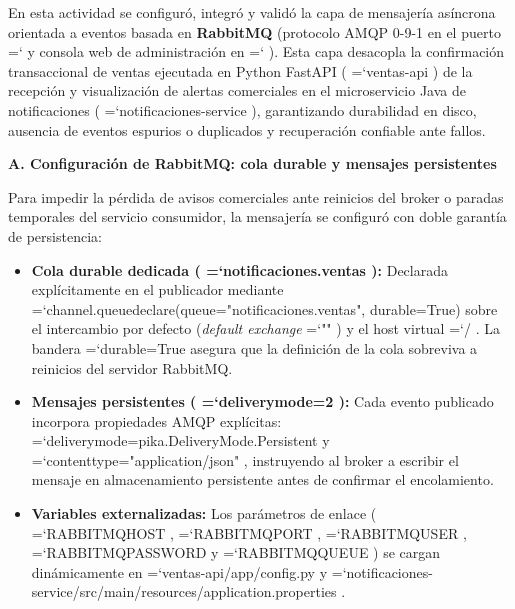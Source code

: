 \documentclass[11pt,a4paper]{article}
\renewcommand{\_}{\oldunderscore\allowbreak}
\DeclareRobustCommand{\texttt}[1]{%
  {\upshape\ttfamily\fontsize{9}{10.8}\selectfont\hyphenchar\font=`\-\relax #1}%
}
\begin{document}
\vspace{0.2cm}
\noindent En esta actividad se configuró, integró y validó la capa de mensajería asíncrona orientada a eventos basada en \textbf{RabbitMQ} (protocolo AMQP 0-9-1 en el puerto \texttt{5672} y consola web de administración en \texttt{15672}). Esta capa desacopla la confirmación transaccional de ventas ejecutada en Python FastAPI (\texttt{ventas-api}) de la recepción y visualización de alertas comerciales en el microservicio Java de notificaciones (\texttt{notificaciones-service}), garantizando durabilidad en disco, ausencia de eventos espurios o duplicados y recuperación confiable ante fallos.

\vspace{0.2cm}
\noindent\textbf{A. Configuración de RabbitMQ: cola durable y mensajes persistentes}

\noindent Para impedir la pérdida de avisos comerciales ante reinicios del broker o paradas temporales del servicio consumidor, la mensajería se configuró con doble garantía de persistencia:
\begin{itemize}[leftmargin=*,itemsep=2pt,topsep=1pt]
  \item \textbf{Cola durable dedicada (\texttt{notificaciones.\allowbreak{}ventas}):} Declarada explícitamente en el publicador mediante \texttt{channel.\allowbreak{}queue\_declare(queue=\allowbreak{}"notificaciones.\allowbreak{}ventas", durable=\allowbreak{}True)} sobre el intercambio por defecto (\textit{default exchange} \texttt{""}) y el host virtual \texttt{/}. La bandera \texttt{durable=\allowbreak{}True} asegura que la definición de la cola sobreviva a reinicios del servidor RabbitMQ.
  \item \textbf{Mensajes persistentes (\texttt{delivery\_mode=\allowbreak{}2}):} Cada evento publicado incorpora propiedades AMQP explícitas: \texttt{delivery\_mode=\allowbreak{}pika.\allowbreak{}DeliveryMode.\allowbreak{}Persistent} y \texttt{content\_type=\allowbreak{}"application/\allowbreak{}json"}, instruyendo al broker a escribir el mensaje en almacenamiento persistente antes de confirmar el encolamiento.
  \item \textbf{Variables externalizadas:} Los parámetros de enlace (\texttt{RABBITMQ\_HOST}, \texttt{RABBITMQ\_PORT}, \texttt{RABBITMQ\_USER}, \texttt{RABBITMQ\_PASSWORD} y \texttt{RABBITMQ\_QUEUE}) se cargan dinámicamente en \texttt{ventas-api/\allowbreak{}app/\allowbreak{}config.\allowbreak{}py} y \texttt{notificaciones-service/\allowbreak{}src/\allowbreak{}main/\allowbreak{}resources/\allowbreak{}application.\allowbreak{}properties}.
\end{itemize}
\end{document}
